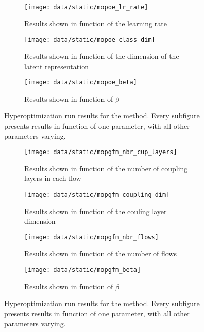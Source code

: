 \begin{figure}
    \centering
    \begin{subfigure}[b]{0.49\textwidth}
        \centering
        \texttt{[image: data/static/mopoe\_lr\_rate]}
        \caption{Results shown in function of the learning rate}
        \label{subfig:mopoe_lr_rate}
    \end{subfigure}
    \hfill
    \begin{subfigure}[b]{0.49\textwidth}
        \centering
        \texttt{[image: data/static/mopoe\_class\_dim]}
        \caption{Results shown in function of the dimension of the latent representation}
    \end{subfigure}
    \hfill
    \begin{subfigure}[b]{0.5\textwidth}
        \centering
        \texttt{[image: data/static/mopoe\_beta]}
        \caption{Results shown in function of $\beta$}
    \end{subfigure}
    \caption{Hyperoptimization run results for the  method. Every subfigure presents results in function of one parameter, with all other parameters varying.}
    \label{fig:mopoe hyperopt}
\end{figure}

\begin{figure}
    \centering
    \begin{subfigure}[b]{0.49\textwidth}
        \centering
        \texttt{[image: data/static/mopgfm\_nbr\_cup\_layers]}
        \caption{Results shown in function of the number of coupling layers in each flow}
    \end{subfigure}
    \hfill
    \begin{subfigure}[b]{0.49\textwidth}
        \centering
        \texttt{[image: data/static/mopgfm\_coupling\_dim]}
        \caption{Results shown in function of the couling layer dimension}
    \end{subfigure}
    \hfill
    \begin{subfigure}[b]{0.49\textwidth}
        \centering
        \texttt{[image: data/static/mopgfm\_nbr\_flows]}
        \caption{Results shown in function of the number of flows}
        \label{subfig:mopgfm_nbr_flows}
    \end{subfigure}
    \hfill
    \begin{subfigure}[b]{0.49\textwidth}
        \centering
        \texttt{[image: data/static/mopgfm\_beta]}
        \caption{Results shown in function of $\beta$}
    \end{subfigure}
    \caption{Hyperoptimization run results for the  method. Every subfigure presents results in function of one parameter, with all other parameters varying.}
    \label{fig:mopgfm hyperopt}
\end{figure}


